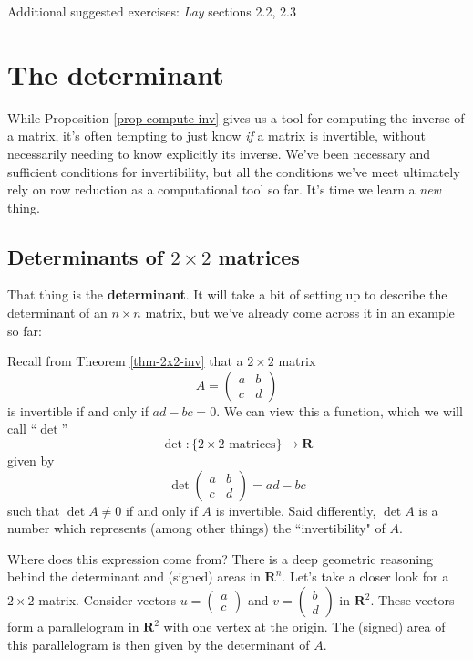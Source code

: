 \documentclass[12pt]{article}
\numberwithin{equation}{subsection}
\numberwithin{figure}{subsection}
\theoremstyle{note}
\begin{document}
Additional suggested exercises: \textit{Lay} sections 2.2, 2.3




\section{The determinant}
While Proposition \ref{prop-compute-inv} gives us a tool for computing the inverse of a matrix, it's often tempting to just know \textit{if} a matrix is invertible, without necessarily needing to know explicitly its inverse. We've been necessary and sufficient conditions for invertibility, but all the conditions we've meet ultimately rely on row reduction as a computational tool so far. It's time we learn a \textit{new} thing. 

\subsection{Determinants of $2\times 2$ matrices}
That thing is the \textbf{determinant}. It will take a bit of setting up to describe the determinant of an $n\times n$ matrix, but we've already come across it in an example so far: 

Recall from Theorem \ref{thm-2x2-inv} that a $2\times 2$ matrix \[ A=\begin{pmatrix} a & b\\ c & d\end{pmatrix}\] is invertible if and only if $ad-bc=0$. We can view this a function, which we will call ``$\det$'' \begin{equation} 
	\det \colon \{ \text{$2\times 2$ matrices} \} \to \mathbf{R}
\end{equation}
given by \begin{equation} \label{det-2x2} \det\begin{pmatrix} a & b \\ c & d \end{pmatrix}=ad-bc\end{equation} such that $\det A \neq 0$ if and only if $A$ is invertible. Said differently, $\det A$ is a number which represents (among other things) the ``invertibility" of $A$. 

Where does this expression come from? There is a deep geometric reasoning behind the determinant and (signed) areas in $\mathbf{R}^n$. Let's take a closer look for a $2\times 2$ matrix. Consider vectors $u=\begin{pmatrix} a \\ c\end{pmatrix}$ and $v=\begin{pmatrix} b \\ d\end{pmatrix}$ in $\mathbf{R}^2$. These vectors form a parallelogram in $\mathbf{R}^2$ with one vertex at the origin. The (signed) area of this parallelogram is then given by the determinant of $A$.
\end{document}
